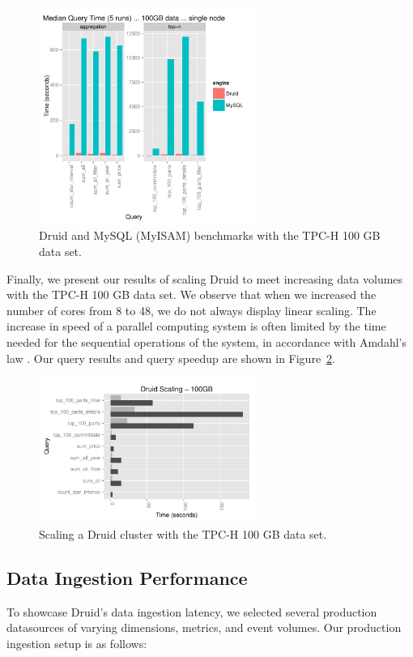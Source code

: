 \documentclass{acm_proc_article-sp}
\begin{document}
\begin{figure}
\centering
\includegraphics[width = 2.8in]{tpch_100gb}
\caption{Druid and MySQL (MyISAM) benchmarks with the TPC-H 100 GB data set.}
\label{fig:tpch_100gb}
\end{figure}

Finally, we present our results of scaling Druid to meet increasing data
volumes with the TPC-H 100 GB data set. We observe that when we increased the
number of cores from 8 to 48, we do not always display linear scaling.
The increase in speed of a parallel computing system is often limited by the
time needed for the sequential operations of the system, in accordance with
Amdahl's law \cite{amdahl1967validity}. Our query results and query speedup are
shown in Figure~\ref{fig:tpch_scaling}.

\begin{figure}
\centering
\includegraphics[width = 2.8in]{tpch_scaling}
\caption{Scaling a Druid cluster with the TPC-H 100 GB data set.}
\label{fig:tpch_scaling}
\end{figure}

\subsection{Data Ingestion Performance}
To showcase Druid's data ingestion latency, we selected several production
datasources of varying dimensions, metrics, and event volumes. Our production
ingestion setup is as follows:
\end{document}
